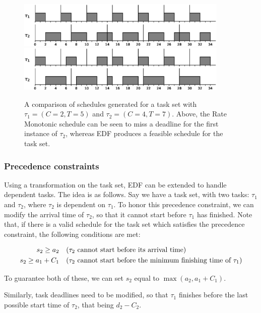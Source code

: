 \documentclass[twoside]{uva-inf-bachelor-thesis}
\newcommand{\task}[1]{\ensuremath{\tau_#1}}
\begin{document}
\begin{figure}[htpb]
    \centering
    \includegraphics[width=0.9\textwidth]{rmfail.eps}
    \includegraphics[width=0.9\textwidth]{edfsucc.eps}
    \caption{A comparison of schedules generated for a task set with $\tau_1 = (C = 2, T = 5)$ and $\tau_2 = (C = 4, T = 7)$. Above, the Rate Monotonic schedule can be seen to miss a deadline for the first instance of $\tau_2$, whereas EDF produces a feasible schedule for the task set.}
    \label{fig:edfrmfeasible}
\end{figure}

\subsubsection{Precedence constraints}
Using a transformation on the task set, EDF can be extended to handle dependent tasks\cite{Chetto1990}. The idea is as follows. Say we have a task set, with two tasks: \task{1} and \task{2}, where \task{2} is dependent on \task{1}. To honor this precedence constraint, we can modify the arrival time of \task{2}, so that it cannot start before \task{1} has finished. Note that, if there is a valid schedule for the task set which satisfies the precedence constraint, the following conditions are met:

\begin{align}
    s_2 \ge a_2 \quad &\text{(\task{2} cannot start before its arrival time)}\\
    s_2 \ge a_1 + C_1 \quad &\text{(\task{2} cannot start before the minimum finishing time of \task{1})}
\end{align}

To guarantee both of these, we can set $s_2$ equal to $\max(a_2, a_1 + C_1)$.

Similarly, task deadlines need to be modified, so that \task{1} finishes before the last possible start time of \task{2}, that being $d_2 - C_2$.
\end{document}
